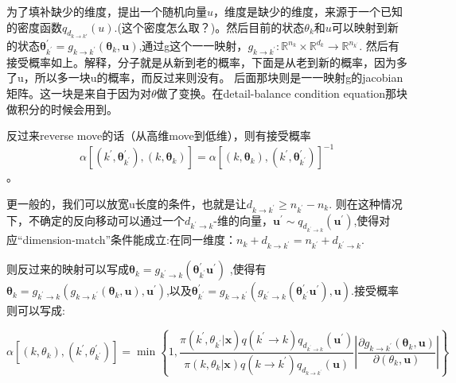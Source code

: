\documentclass[
]{book}
\theoremstyle{definition}
\theoremstyle{definition}
\theoremstyle{definition}
\theoremstyle{remark}
\begin{document}
为了填补缺少的维度，提出一个随机向量\(u\)，维度是缺少的维度，来源于一个已知的密度函数\(q_{d_{k\rightarrow k'}}(u)\).(这个密度怎么取？)。然后目前的状态\(\theta_k\)和\(u\)可以映射到新的状态\(\boldsymbol{\theta}_{k^{\prime}}^{\prime}=g_{k \rightarrow k^{\prime}}\left(\boldsymbol{\theta}_{k}, \mathbf{u}\right)\),通过g这个一一映射，\(g_{k \rightarrow k^{\prime}} : \mathbb{R}^{n_{k}} \times \mathbb{R}^{d_{k}} \rightarrow \mathbb{R}^{n_{k^{\prime}}}\). 然后有接受概率如上。解释，分子就是从新到老的概率，下面是从老到新的概率，因为多了u，所以多一块u的概率，而反过来则没有。
后面那块则是一一映射g的jacobian矩阵。这一块是来自于因为对\(\theta\)做了变换。在detail-balance condition equation那块做积分的时候会用到。

反过来reverse move的话（从高维move到低维），则有接受概率
\[
\alpha\left[\left(k^{\prime}, \boldsymbol{\theta}_{k^{\prime}}^{\prime}\right),\left(k, \boldsymbol{\theta}_{k}\right)\right]=\alpha\left[\left(k, \boldsymbol{\theta}_{k}\right),\left(k^{\prime}, \boldsymbol{\theta}_{k^{\prime}}^{\prime}\right)\right]^{-1}
\]
。

更一般的，我们可以放宽u长度的条件，也就是让\(d_{k \rightarrow k^{\prime}} \geq n_{k^{\prime}}-n_{k}\). 则在这种情况下，不确定的反向移动可以通过一个\(d_{k^{\prime} \rightarrow k}\)-维的向量，\(\mathbf{u}^{\prime} \sim q_{d_{k^{\prime} \rightarrow k}}\left(\mathbf{u}^{\prime}\right)\),使得对应``dimension-match''条件能成立:在同一维度：\(n_{k}+d_{k \rightarrow k^{\prime}}=n_{k^{\prime}}+d_{k^{\prime} \rightarrow k}\).

则反过来的映射可以写成\(\boldsymbol{\theta}_{k}=g_{k^{\prime} \rightarrow k}\left(\boldsymbol{\theta}_{k^{\prime}}^{\prime} \mathbf{u}^{\prime}\right)\) ,使得有\(\boldsymbol{\theta}_{k}=g_{k^{\prime} \rightarrow k}\left(g_{k \rightarrow k^{\prime}}\left(\boldsymbol{\theta}_{k}, \mathbf{u}\right), \mathbf{u}^{\prime}\right)\),以及\(\boldsymbol{\theta}_{k^{\prime}}^{\prime}=g_{k \rightarrow k^{\prime}}\left(g_{k^{\prime} \rightarrow k}\left(\boldsymbol{\theta}_{k^{\prime}}^{\prime} \mathbf{u}^{\prime}\right), \mathbf{u}\right)\).接受概率则可以写成:

\[
\alpha\left[\left(k, \theta_{k}\right),\left(k^{\prime}, \theta_{k^{\prime}}^{\prime}\right)\right]=\min \left\{1, \frac{\pi\left(k^{\prime}, \theta_{k^{\prime}} | \mathbf{x}\right) q\left(k^{\prime} \rightarrow k\right) q_{d_{k^{\prime} \rightarrow k}}\left(\mathbf{u}^{\prime}\right)}{\pi\left(k, \theta_{k} | \mathbf{x}\right) q\left(k \rightarrow k^{\prime}\right) q_{d_{k \rightarrow k^{\prime}}}(\mathbf{u})}\left|\frac{\partial g_{k \rightarrow k^{\prime}}\left(\boldsymbol{\theta}_{k}, \mathbf{u}\right)}{\partial\left(\theta_{k}, \mathbf{u}\right)}\right|\right\}
\]
\end{document}
